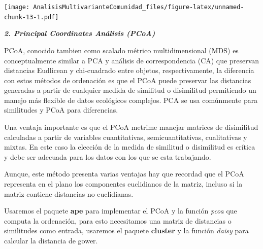 \documentclass[]{book}
\newenvironment{Shaded}{\begin{snugshade}}{\end{snugshade}}
\newcommand{\KeywordTok}[1]{\textcolor[rgb]{0.13,0.29,0.53}{\textbf{{#1}}}}
\newcommand{\StringTok}[1]{\textcolor[rgb]{0.31,0.60,0.02}{{#1}}}
\newcommand{\CommentTok}[1]{\textcolor[rgb]{0.56,0.35,0.01}{\textit{{#1}}}}
\newcommand{\NormalTok}[1]{{#1}}
\begin{document}
\texttt{[image: AnalisisMultivarianteComunidad\_files/figure-latex/unnamed-chunk-13-1.pdf]}

\textbf{\emph{2. Principal Coordinates Análisis (PCoA)}}

PCoA, conocido tambien como scalado métrico multidimensional (MDS) es
conceptualmente similar a PCA y análisis de correspondencia (CA) que
preservan distancias Eudlicean y chi-cuadrado entre objetos,
respectivamente, la diferencia con estos métodos de ordenación es que el
PCoA puede preservar las distancias generadas a partir de cualquier
medida de similitud o disimilitud permitiendo un manejo más flexible de
datos ecológicos complejos. PCA se usa comúnmente para similitudes y
PCoA para diferencias.

Una ventaja importante es que el PCoA metrime manejar matrices de
disimilitud calculadas a partir de variables cuantitativas,
semicuantitativas, cualitativas y mixtas. En este caso la elección de la
medida de similitud o disimilitud es crítica y debe ser adecuada para
los datos con los que se esta trabajando.

Aunque, este método presenta varias ventajas hay que recordad que el
PCoA representa en el plano los componentes euclidianos de la matriz,
incluso si la matriz contiene distancias no euclidianas.

Usaremos el paquete \textbf{ape} para implementar el PCoA y la función
\emph{pcoa} que computa la ordenación, para esto necesitamos una matriz
de distancias o similitudes como entrada, usaremos el paquete
\textbf{cluster} y la función \emph{daisy} para calcular la distancia de
gower.

\begin{Shaded}
\end{Shaded}
\end{document}
